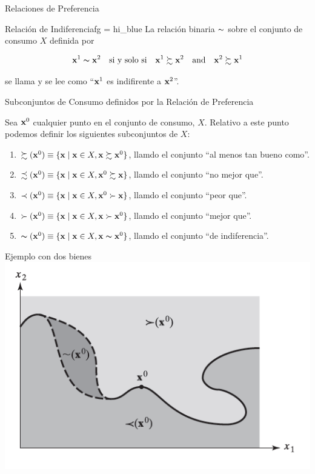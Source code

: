 \documentclass[10pt,aspectratio=169]{beamer}  %
\begin{document}
\begin{frame}{Relaciones de Preferencia}
  \begin{varblock}{Relación de Indiferencia}{fg = hi_blue}
    \vsf
    La relación binaria $\thicksim$ sobre el conjunto de consumo $X$ definida por
    
    \[ \mathbf{x}^1 \thicksim \mathbf{x}^2 \quad \text{si y solo si} \quad \mathbf{x}^1 \succsim \mathbf{x}^2 \quad \text{and} \quad \mathbf{x}^2 \succsim  \mathbf{x}^1\]

    se llama  y se lee como ``$\mathbf{x}^1$ es indifirente a $\mathbf{x}^2$''.
    \vsf
  \end{varblock}		

\end{frame}

\begin{frame}{Subconjuntos de Consumo definidos por la Relación de Preferencia}

  Sea $\mathbf{x}^0$ cualquier punto en el conjunto de consumo, $X$. Relativo a este punto podemos definir los
  siguientes subconjuntos de $X$:

  \begin{enumerate}
    \item $\succsim(\mathbf{x}^0) \equiv \{\mathbf{x} \mid \mathbf{x} \in X, \mathbf{x} \succsim \mathbf{x}^0\}$, llamdo el conjunto ``al menos tan bueno como''.
    \item $\precsim(\mathbf{x}^0) \equiv \{\mathbf{x} \mid \mathbf{x} \in X, \mathbf{x}^0 \succsim \mathbf{x}\}$, llamdo el conjunto ``no mejor que''.
    \item $\prec(\mathbf{x}^0) \equiv \{\mathbf{x} \mid \mathbf{x} \in X, \mathbf{x}^0 \succ \mathbf{x}\}$, llamdo el conjunto ``peor que''.
    \item $\succ(\mathbf{x}^0) \equiv \{\mathbf{x} \mid \mathbf{x} \in X, \mathbf{x} \succ \mathbf{x}^0\}$, llamdo el conjunto ``mejor que''.
    \item $\thicksim(\mathbf{x}^0) \equiv \{\mathbf{x} \mid \mathbf{x} \in X, \mathbf{x} \thicksim \mathbf{x}^0\}$, llamdo el conjunto ``de indiferencia''.
  \end{enumerate}

\end{frame}


\begin{frame}{Ejemplo con dos bienes}
  \centering
  \includegraphics[scale=.70]{images/fig1.1.png}
\end{frame}
\end{document}
